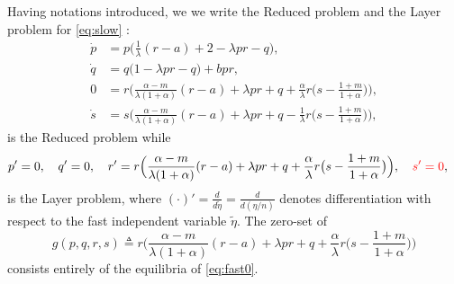 \documentclass[a4paper,11pt]{article}
\def\red{\color{red}}
\theoremstyle{remark}
\begin{document}
Having notations introduced, we we write the Reduced problem and the Layer problem for \eqref{eq:slow} :
\begin{equation}\label{eq:slow0} \tag{R}
 \begin{aligned}
 \dot{p} &=p\Big(\frac{1}{\lambda}({r}-a) + 2- \lambda p {r} -q\Big),\\%
 \dot{q} &=q\Big(1 -\lambda p {r} -q\Big) + b p {r},\\%
 0&=r\Big(\frac{\alpha-m}{\lambda(1+\alpha)}(r-a) + \lambda pr + q +\frac{\alpha}{\lambda}r\big(s- \frac{1+m}{1+\alpha}\big)\Big),\\
 \dot{s} &=s\Big(\frac{\alpha-m}{\lambda(1+\alpha)}({r}-a) + \lambda p{r} + q - \frac{1}{\lambda}{r}\big(s- \frac{1+m}{1+\alpha}\big)\Big),%
 \end{aligned}
\end{equation}
is the Reduced problem while
\begin{equation} \label{eq:fast0} 
 \begin{aligned}
 {p}' &=0, \quad {q}' =0, \quad {r}' =r\Big(\frac{\alpha-m}{\lambda(1+\alpha)}(r-a) + \lambda pr + q +\frac{\alpha}{\lambda}r\big(s- \frac{1+m}{1+\alpha}\big)\Big), {\red  \quad{s}' =0 },
 \end{aligned}
\end{equation}
is the Layer problem, where $(\cdot)'= \frac{d}{d\tilde{\eta}} = \frac{d}{d(\eta/n)}$ denotes differentiation with respect to the fast independent variable $\tilde{\eta}$. The zero-set of
\begin{equation}
g(p,q,r,s)\triangleq r\Big(\frac{\alpha-m}{\lambda(1+\alpha)}(r-a) + \lambda pr + q +\frac{\alpha}{\lambda}r\big(s- \frac{1+m}{1+\alpha}\big)\Big)\label{eq:zeroset} 
\end{equation}
consists entirely of the equilibria of \eqref{eq:fast0}. %
\end{document}
